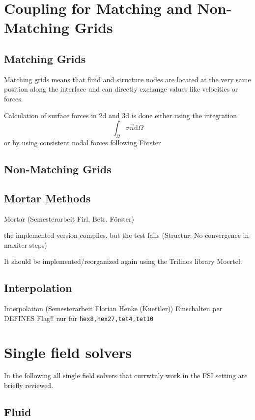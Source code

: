 \section{Coupling for Matching and Non-Matching Grids}

\subsection{Matching Grids}
Matching grids means that fluid and structure nodes are located at the very same position along the interface und can directly exchange values like velocities or forces.

Calculation of surface forces in 2d and 3d is done either using the integration
\begin{equation}
\int_\Omega \sigma \vec{n} \mathrm{d}\Omega
\end{equation}
or by using consistent nodal forces following Förster


\subsection{Non-Matching Grids}

\subsection{Mortar Methods}
Mortar (Semesterarbeit Firl, Betr. Förster)

the implemented version compiles, but the test fails (Structur: No convergence in maxiter steps)


It should be implemented/reorganized again using the Trilinos library Moertel.

\subsection{Interpolation}
Interpolation (Semesterarbeit Florian Henke (Kuettler))
Einschalten per DEFINES Flag!!
nur für \verb|hex8,hex27,tet4,tet10|





\section{Single field solvers}

In the following all single field solvers that currwtnly work in the FSI setting are briefly reviewed.

\subsection{Fluid}

